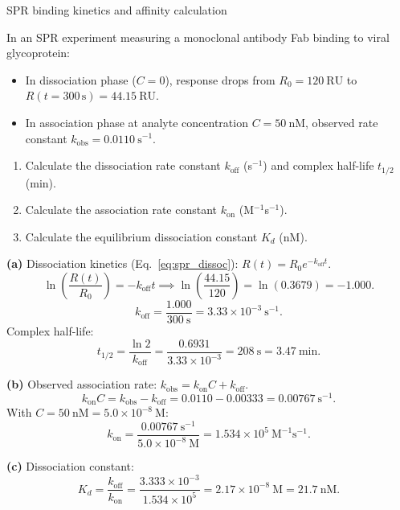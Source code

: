 \documentclass[12pt, a4paper, oneside]{report}
\begin{document}
\begin{problem}{\enspace{}\enspace
  SPR binding kinetics and affinity calculation}

  In an SPR experiment measuring a monoclonal antibody Fab binding to viral glycoprotein:
  \begin{itemize}
    \item In dissociation phase ($C=0$), response drops from $R_0 = 120~\text{RU}$ to $R(t=300\,\text{s}) = 44.15~\text{RU}$.
    \item In association phase at analyte concentration $C = 50~\text{nM}$, observed rate constant $k_{\text{obs}} = 0.0110~\text{s}^{-1}$.
  \end{itemize}

  \begin{enumerate}
    \item Calculate the dissociation rate constant $k_{\text{off}}$ (s$^{-1}$) and complex half-life $t_{1/2}$ (min).
    \item Calculate the association rate constant $k_{\text{on}}$ (M$^{-1}$s$^{-1}$).
    \item Calculate the equilibrium dissociation constant $K_d$ (nM).
  \end{enumerate}
\end{problem}

\begin{solution}
  \textbf{(a)} Dissociation kinetics (Eq.~\ref{eq:spr_dissoc}): $R(t) = R_0 e^{-k_{\text{off}} t}$.
  \[
    \ln\left(\frac{R(t)}{R_0}\right) = -k_{\text{off}} t \implies \ln\left(\frac{44.15}{120}\right) = \ln(0.3679) = -1.000.
  \]
  \[
    k_{\text{off}} = \frac{1.000}{300~\text{s}} = 3.33 \times 10^{-3}~\text{s}^{-1}.
  \]
  Complex half-life:
  \[
    t_{1/2} = \frac{\ln 2}{k_{\text{off}}} = \frac{0.6931}{3.33 \times 10^{-3}} = 208~\text{s} = 3.47~\text{min}.
  \]

  \textbf{(b)} Observed association rate: $k_{\text{obs}} = k_{\text{on}} C + k_{\text{off}}$.
  \[
    k_{\text{on}} C = k_{\text{obs}} - k_{\text{off}} = 0.0110 - 0.00333 = 0.00767~\text{s}^{-1}.
  \]
  With $C = 50~\text{nM} = 5.0 \times 10^{-8}~\text{M}$:
  \[
    k_{\text{on}} = \frac{0.00767~\text{s}^{-1}}{5.0 \times 10^{-8}~\text{M}} = 1.534 \times 10^5~\text{M}^{-1}\text{s}^{-1}.
  \]

  \textbf{(c)} Dissociation constant:
  \[
    K_d = \frac{k_{\text{off}}}{k_{\text{on}}} = \frac{3.333 \times 10^{-3}}{1.534 \times 10^5} = 2.17 \times 10^{-8}~\text{M} = 21.7~\text{nM}.
  \]
\end{solution}
\end{document}
